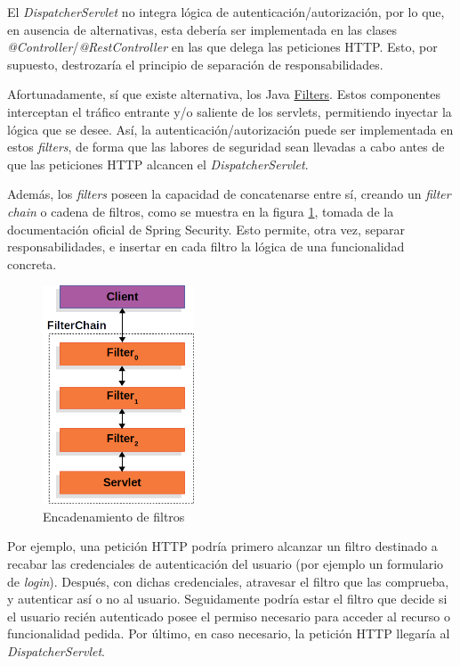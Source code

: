 \documentclass[a4paper,12pt,twoside,openright]{report}
\begin{document}
	El \emph{DispatcherServlet} no integra lógica de autenticación/autorización, por lo que, en ausencia de alternativas, esta debería ser implementada en las clases \emph{@Controller}/\emph{@RestController} en las que delega las peticiones HTTP. Esto, por supuesto, destrozaría el principio de separación de responsabilidades. 
	
	Afortunadamente, sí que existe alternativa, los Java \href{https://www.oracle.com/java/technologies/filters.html}{Filters}. Estos componentes interceptan el tráfico entrante y/o saliente de los servlets, permitiendo inyectar la lógica que se desee. Así, la autenticación/autorización puede ser implementada en estos \emph{filters}, de forma que las labores de seguridad sean llevadas a cabo antes de que las peticiones HTTP alcancen el \emph{DispatcherServlet}.
	
	Además, los \emph{filters} poseen la capacidad de concatenarse entre sí, creando un \emph{filter chain} o cadena de filtros, como se muestra en la figura \ref{fig:filterchain}, tomada de la documentación oficial de Spring Security. Esto permite, otra vez, separar responsabilidades, e insertar en cada filtro la lógica de una funcionalidad concreta.
	
	\begin{figure}[hbt!]
		\centering
		\includegraphics[width=0.4\textwidth,keepaspectratio]{filterchain}
		\caption{Encadenamiento de filtros}
		\label{fig:filterchain}
	\end{figure}
	
	Por ejemplo, una petición HTTP podría primero alcanzar un filtro destinado a recabar las credenciales de autenticación del usuario (por ejemplo un formulario de \emph{login}). Después, con dichas credenciales, atravesar el filtro que las comprueba, y autenticar así o no al usuario. Seguidamente podría estar el filtro que decide si el usuario recién autenticado posee el permiso necesario para acceder al recurso o funcionalidad pedida. Por último, en caso necesario, la petición HTTP llegaría al \emph{DispatcherServlet}.
	
\end{document}

